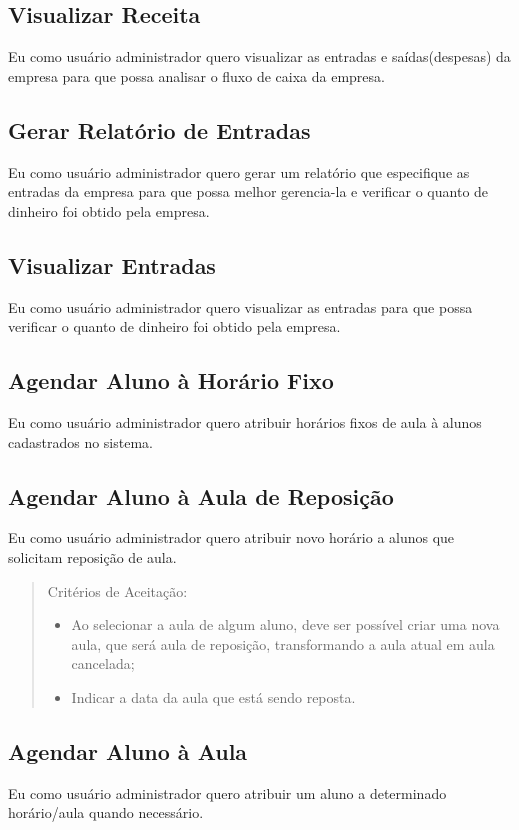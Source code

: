 \subsection[Visualizar Receita]{Visualizar Receita}
Eu como usuário administrador quero visualizar as entradas e saídas(despesas) da empresa
para que possa analisar o fluxo de caixa da empresa.

\subsection[Gerar Relatório de Entradas]{Gerar Relatório de Entradas}
Eu como usuário administrador quero gerar um relatório que especifique as
entradas da empresa para que possa melhor gerencia-la e verificar o quanto de
dinheiro foi obtido pela empresa.

\subsection[Visualizar Entradas]{Visualizar Entradas}
Eu como usuário administrador quero visualizar as entradas para que possa
verificar o quanto de dinheiro foi obtido pela empresa.

\subsection[Agendar Aluno à Horário Fixo]{Agendar Aluno à Horário Fixo}
Eu como usuário administrador quero atribuir horários fixos de aula à alunos
cadastrados no sistema.

\subsection[Agendar Aluno à Aula de Reposição]{Agendar Aluno à Aula de Reposição}
Eu como usuário administrador quero atribuir novo horário a alunos que solicitam
reposição de aula.

\begin{quote}
Critérios de Aceitação:
    \begin{itemize}
        \item Ao selecionar a aula de algum aluno, deve ser possível criar uma nova aula,
        que será aula de reposição, transformando a aula atual em aula cancelada;
        \item Indicar a data da aula que está sendo reposta.
    \end{itemize}
\end{quote}

\subsection[Agendar Aluno à Aula]{Agendar Aluno à Aula}
Eu como usuário administrador quero atribuir um aluno a determinado
horário/aula quando necessário.

